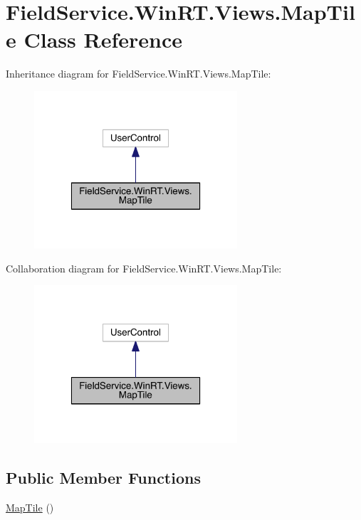 \hypertarget{class_field_service_1_1_win_r_t_1_1_views_1_1_map_tile}{\section{Field\+Service.\+Win\+R\+T.\+Views.\+Map\+Tile Class Reference}
\label{class_field_service_1_1_win_r_t_1_1_views_1_1_map_tile}
}


Inheritance diagram for Field\+Service.\+Win\+R\+T.\+Views.\+Map\+Tile\+:
\nopagebreak
\begin{figure}[H]
\begin{center}
\leavevmode
\includegraphics[width=214pt]{class_field_service_1_1_win_r_t_1_1_views_1_1_map_tile__inherit__graph}
\end{center}
\end{figure}


Collaboration diagram for Field\+Service.\+Win\+R\+T.\+Views.\+Map\+Tile\+:
\nopagebreak
\begin{figure}[H]
\begin{center}
\leavevmode
\includegraphics[width=214pt]{class_field_service_1_1_win_r_t_1_1_views_1_1_map_tile__coll__graph}
\end{center}
\end{figure}
\subsection*{Public Member Functions}
\begin{DoxyCompactItemize}
\item 
\hyperlink{class_field_service_1_1_win_r_t_1_1_views_1_1_map_tile_a472982181ea0c762a6027176c8d3baf9}{Map\+Tile} ()
\end{DoxyCompactItemize}


